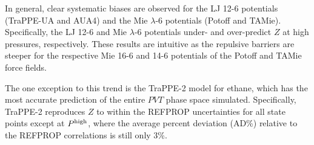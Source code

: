 \documentclass[preprint,letterpaper,floatfix,citeautoscript,aip,jcp]{revtex4-1}
\begin{document}
In general, 
clear systematic biases are observed for the LJ 12-6 potentials (TraPPE-UA and AUA4) and the Mie $\lambda$-6 potentials (Potoff and TAMie). Specifically, the LJ 12-6 and Mie $\lambda$-6 potentials under- and over-predict $Z$ at high pressures, respectively. These results are intuitive as the repulsive barriers are steeper for the respective Mie 16-6 and 14-6 potentials of the Potoff and TAMie force fields. 



The one exception to this trend is the TraPPE-2 model for ethane, which has the most accurate prediction of the entire $PVT$ phase space simulated. Specifically, TraPPE-2 reproduces $Z$ to within the REFPROP uncertainties for all state points except at $P^{\rm high}$, where the average percent deviation (AD\%) relative to the REFPROP correlations is still only 3\%.

\end{document}
